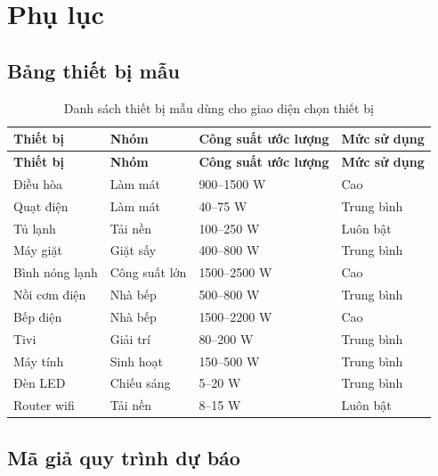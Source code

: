 \appendix
\chapter{Phụ lục}

\section{Bảng thiết bị mẫu}

\begin{longtable}{p{4cm} p{3cm} p{3cm} p{3cm}}
  \caption{Danh sách thiết bị mẫu dùng cho giao diện chọn thiết bị} \\
  \toprule
  \textbf{Thiết bị} & \textbf{Nhóm} & \textbf{Công suất ước lượng} & \textbf{Mức sử dụng} \\
  \midrule
  \endfirsthead
  \toprule
  \textbf{Thiết bị} & \textbf{Nhóm} & \textbf{Công suất ước lượng} & \textbf{Mức sử dụng} \\
  \midrule
  \endhead
  Điều hòa & Làm mát & 900--1500 W & Cao \\
  Quạt điện & Làm mát & 40--75 W & Trung bình \\
  Tủ lạnh & Tải nền & 100--250 W & Luôn bật \\
  Máy giặt & Giặt sấy & 400--800 W & Trung bình \\
  Bình nóng lạnh & Công suất lớn & 1500--2500 W & Cao \\
  Nồi cơm điện & Nhà bếp & 500--800 W & Trung bình \\
  Bếp điện & Nhà bếp & 1500--2200 W & Cao \\
  Tivi & Giải trí & 80--200 W & Trung bình \\
  Máy tính & Sinh hoạt & 150--500 W & Trung bình \\
  Đèn LED & Chiếu sáng & 5--20 W & Trung bình \\
  Router wifi & Tải nền & 8--15 W & Luôn bật \\
  \bottomrule
\end{longtable}

\section{Mã giả quy trình dự báo}

